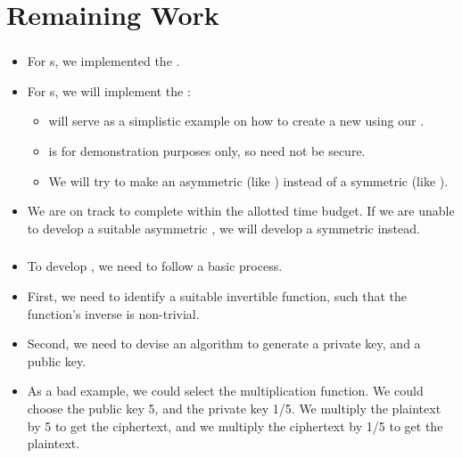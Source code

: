\section{Remaining Work}


\begin{frame}
\frametitle{}
\begin{itemize}
\item For \eu s, we implemented the \rsa{} \cs.
\item For \cg s, we will implement the \dummy{} \cs:
  \begin{itemize}
  \item \dummy{} will serve as a simplistic example
    on how to create a new \cs{} using our \cry{} \cf.
  \item \dummy{} is for demonstration purposes only,
    so \dummy{} need not be secure.
  \item We will try to make \dummy{} an asymmetric \cs{}
    (like \rsa) instead of a symmetric \cs{} (like \aes).
  \end{itemize}
\item We are on track to complete \cry{} within the allotted
  time budget. If we are unable to develop a suitable
  asymmetric \cs{}, we will develop a symmetric \cs{}
  instead.
\end{itemize}
\end{frame}

\begin{frame}
\frametitle{}
\begin{itemize}
  \item To develop \dummy{}, we need to follow a basic
    process.
  \item First, we need to identify a suitable invertible
    function, such that the function's inverse is
    non-trivial.
  \item Second, we need to devise an algorithm to generate
    a private key, and a public key.
  \item As a bad example, we could select the multiplication
    function. We could choose the public key 5, and the
    private key 1/5. We multiply the plaintext by 5 to get
    the ciphertext, and we multiply the ciphertext by 1/5 to
    get the plaintext.
\end{itemize}
\end{frame}
